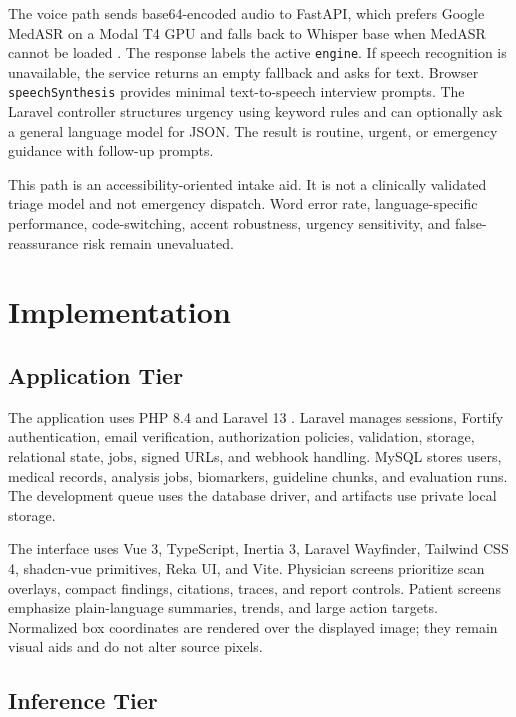 \documentclass[conference]{IEEEtran}
\begin{document}
The voice path sends base64-encoded audio to FastAPI, which prefers Google MedASR on a Modal T4 GPU and falls back to Whisper base when MedASR cannot be loaded \cite{radford2023whisper}. The response labels the active \texttt{engine}. If speech recognition is unavailable, the service returns an empty fallback and asks for text. Browser \texttt{speechSynthesis} provides minimal text-to-speech interview prompts. The Laravel controller structures urgency using keyword rules and can optionally ask a general language model for JSON. The result is routine, urgent, or emergency guidance with follow-up prompts.

This path is an accessibility-oriented intake aid. It is not a clinically validated triage model and not emergency dispatch. Word error rate, language-specific performance, code-switching, accent robustness, urgency sensitivity, and false-reassurance risk remain unevaluated.

\section{Implementation}

\subsection{Application Tier}

The application uses PHP 8.4 and Laravel 13 \cite{laravel13}. Laravel manages sessions, Fortify authentication, email verification, authorization policies, validation, storage, relational state, jobs, signed URLs, and webhook handling. MySQL stores users, medical records, analysis jobs, biomarkers, guideline chunks, and evaluation runs. The development queue uses the database driver, and artifacts use private local storage.

The interface uses Vue 3, TypeScript, Inertia 3, Laravel Wayfinder, Tailwind CSS 4, shadcn-vue primitives, Reka UI, and Vite. Physician screens prioritize scan overlays, compact findings, citations, traces, and report controls. Patient screens emphasize plain-language summaries, trends, and large action targets. Normalized box coordinates are rendered over the displayed image; they remain visual aids and do not alter source pixels.

\subsection{Inference Tier}
\end{document}
